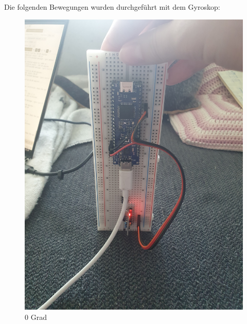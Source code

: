 Die folgenden Bewegungen wurden durchgeführt mit dem Gyroskop: 

\begin{figure}[H]
  \centering
  \begin{minipage}[b]{0.29\textwidth}
    \centering
    \includegraphics[width=\textwidth, angle=-90]{assets/ET/Gyroskop/gyro-0-deg.jpg}
    \caption{0 Grad}
    \label{fig:gyro-0}
  \end{minipage}
  \hfill
  \begin{minipage}[b]{0.29\textwidth}
    \centering

\end{minipage}
\end{figure}
